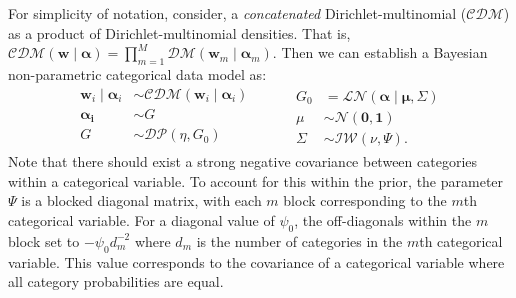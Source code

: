   For simplicity of notation, consider, a \emph{concatenated} Dirichlet-multinomial 
  ($\mathcal{CDM}$) as a product of Dirichlet-multinomial densities.  That is, 
  $\mathcal{CDM}(\bm{w}\mid\bm{\alpha}) = \prod_{m = 1}^M\mathcal{DM}(\bm{w}_m\mid\bm{\alpha}_m)$.
  Then we can establish a Bayesian non-parametric categorical data model as:
  \begin{equation}
    \label{eqn:modelcat}
    \begin{aligned}
      \bm{w}_i \mid \bm{\alpha}_i &\sim \mathcal{CDM}\left(\bm{w}_i\mid\bm{\alpha}_i\right)\\
      \bm{\alpha_i} &\sim G\\
      G &\sim \mathcal{DP}\left(\eta, G_0\right)\\
    \end{aligned}
    ~\hspace{1cm}
    \begin{aligned}
    G_0 &= \mathcal{LN}\left(\bm{\alpha}\mid\bm{\mu},\Sigma\right)\\
    \mu &\sim \mathcal{N}\left(\bm{0},\bm{1}\right)\\
    \Sigma &\sim \mathcal{IW}\left(\nu, \Psi\right).
    \end{aligned}
  \end{equation}
  Note that there should exist a strong negative covariance between categories 
  within a categorical variable.  To account for this within the prior, the 
  parameter $\Psi$ is a blocked diagonal matrix, with each $m$ block 
  corresponding to the $m$th categorical variable.  For a diagonal value of 
  $\psi_0$, the off-diagonals within the $m$ block set to $-\psi_0 d_m^{-2}$ 
  where $d_m$ is the number of categories in the $m$th categorical variable.
  This value corresponds to the covariance of a categorical variable where all 
  category probabilities are equal.

